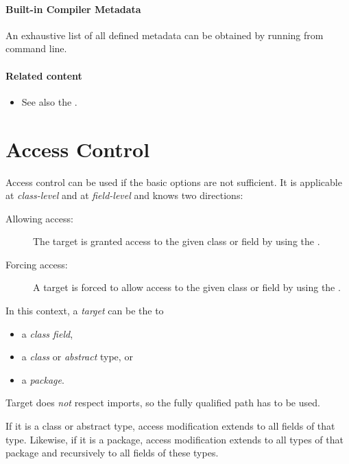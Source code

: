 \paragraph{Built-in Compiler Metadata}
An exhaustive list of all defined metadata can be obtained by running  from command line.


\paragraph{Related content}
\begin{itemize}
	\item See also the .
\end{itemize} 


\section{Access Control}
\label{lf-access-control}

Access control can be used if the basic  options are not sufficient. It is applicable at \emph{class-level} and at \emph{field-level} and knows two directions:

\begin{description}
	\item[Allowing access:] The target is granted access to the given class or field by using the  .
	\item[Forcing access:] A target is forced to allow access to the given class or field by using the  .
\end{description}

In this context, a \emph{target} can be the  to

\begin{itemize}
	\item a \emph{class field},
	\item a \emph{class} or \emph{abstract} type, or
	\item a \emph{package}.
\end{itemize}

Target does \emph{not} respect imports, so the fully qualified path has to be used.

If it is a class or abstract type, access modification extends to all fields of that type. Likewise, if it is a package, access modification extends to all types of that package and recursively to all fields of these types.

